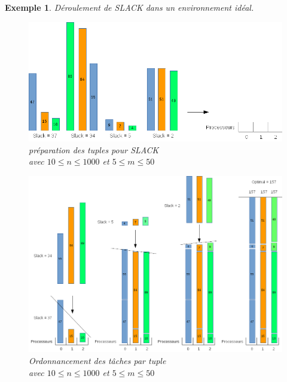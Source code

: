 \documentclass[a4paper,12pt]{report}
\theoremstyle{plain}				%
\newtheorem{example}{Exemple}
\theoremstyle{definition}				%
\begin{document}
\begin{example}
Déroulement de SLACK dans un environnement idéal.

\begin{figure}
{\centering
\includegraphics[width=\columnwidth]{Slack_Non_Unif_Exemple_Ok1.png}
\caption{préparation des tuples pour SLACK\\
\hspace{\linewidth} avec $10\leq n \leq 1000$ et $5\leq m \leq 50$}
\label{ex:SLACKOK1}
\par}
\end{figure}

\begin{figure}
{\centering
\includegraphics[width=\columnwidth]{Slack_Non_Unif_Exemple_Ok2.png}
\caption{Ordonnancement des tâches par tuple\\
\hspace{\linewidth} avec $10\leq n \leq 1000$ et $5\leq m \leq 50$}
\label{ex:SLACKOK2}
\par}
\end{figure}


\end{example}
\end{document}
